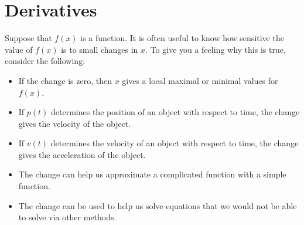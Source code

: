 \chapter{Derivatives}


Suppose that $f(x)$ is a function.  It is often useful to know how
sensitive the value of $f(x)$ is to small changes in $x$. To give you
a feeling why this is true, consider the following:
\begin{itemize}
\item If the change is zero, then $x$ gives a local maximal or minimal
  values for $f(x)$.
\item If $p(t)$ determines the position of an object with respect to
  time, the change gives the velocity of the object.
\item If $v(t)$ determines the velocity of an object with respect to
  time, the change gives the acceleration of the object.
\item The change can help us approximate a complicated function with a
  simple function.
\item The change can be used to help us solve equations that we would
  not be able to solve via other methods.
\end{itemize}

